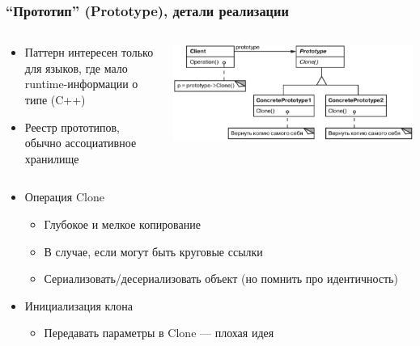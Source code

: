 \documentclass[xetex,mathserif,serif]{beamer}
\begin{document}
	\begin{frame}
		\frametitle{``Прототип'' (Prototype), детали реализации}
		\begin{columns}
			\begin{column}{0.45\textwidth}
				\begin{itemize}
					\item Паттерн интересен только для языков, где мало runtime-информации о типе (C++)
					\item Реестр прототипов, обычно ассоциативное хранилище
				\end{itemize}
			\end{column}
			\begin{column}{0.55\textwidth}
				\begin{center}
					\includegraphics[width=\textwidth]{prototype.png}
				\end{center}
			\end{column}
		\end{columns}
		\begin{itemize}
			\item Операция Clone
			\begin{itemize}
				\item Глубокое и мелкое копирование
				\item В случае, если могут быть круговые ссылки
				\item Сериализовать/десериализовать объект (но помнить про идентичность)
			\end{itemize}
			\item Инициализация клона
			\begin{itemize}
				\item Передавать параметры в Clone --- плохая идея
			\end{itemize}
		\end{itemize}
	\end{frame}
\end{document}
